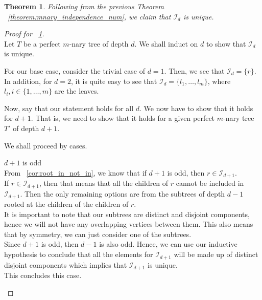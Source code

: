 \documentclass{amsart}
\newtheorem{theorem}{Theorem}[section]
\theoremstyle{definition}
\begin{document}
\begin{theorem}\label{theorem:unique_independence_num}
Following from the previous Theorem ~\ref{theorem:mnary_independence_num}, we claim that $\mathcal{I}_d$ is unique.
\end{theorem}
\begin{proof}[Proof for ~\ref{theorem:unique_independence_num}]
	$ $ \\

	Let $T$ be a perfect $m$-nary tree of depth $d$. We shall induct on $d$ to show that $\mathcal{I}_d$ is unique.

	For our base case, consider the trivial case of $d = 1$. Then, we see that $\mathcal{I}_d = \{r\}$. In addition, for $d = 2$, it is quite easy to see that $\mathcal{I}_d = \{l_1,\dots, l_m\}$, where $l_i, i \in \{1,\dots, m\}$ are the leaves.

	Now, say that our statement holds for all $d$. We now have to show that it holds for $d + 1$. That is, we need to show that it holds for a given perfect $m$-nary tree $T'$ of depth $d + 1$.

	We shall proceed by cases.

	\begin{caseof}
	\item $d + 1$ is odd \\
		From ~\ref{cor:root_in_not_in}, we know that if $d + 1$ is odd, then $r \in \mathcal{I}_{d + 1}$. 
\\
		If $r \in \mathcal{I}_{d + 1}$, then that means that all the children of $r$ cannot be included in $\mathcal{I}_{d + 1}$. Then the only remaining options are from the subtrees of depth $d - 1$ rooted at the children of the children of $r$.
\\
		It is important to note that our subtrees are distinct and disjoint components, hence we will not have any overlapping vertices between them. This also means that by symmetry, we can just consider one of the subtrees.
\\
		Since $d + 1$ is odd, then $d - 1$ is also odd. Hence, we can use our inductive hypothesis to conclude that all the elements for $\mathcal{I}_{d + 1}$ will be made up of distinct disjoint components which implies that $\mathcal{I}_{d + 1}$ is unique. 
\\
		This concludes this case.
	

\end{caseof}
\end{proof}
\end{document}

